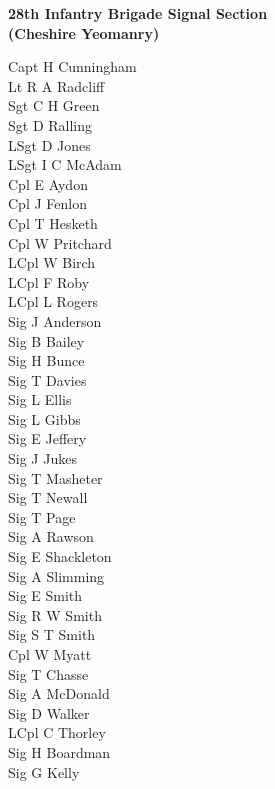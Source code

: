 \vspace*{10mm}

\begin{center}
  \Large
  \textbf{28th Infantry Brigade Signal Section \\ (Cheshire Yeomanry)}
\end{center}

\begin{multicols}{3}
  \footnotesize
  \noindent
  Capt H Cunningham \\
  Lt R A Radcliff \\
  Sgt C H Green \\
  Sgt D Ralling \\
  LSgt D Jones \\
  LSgt I C McAdam \\
  Cpl E Aydon \\
  Cpl J Fenlon \\
  Cpl T Hesketh \\
  Cpl W Pritchard \\
  LCpl W Birch \\
  LCpl F Roby \\
  LCpl L Rogers \\
  Sig J Anderson \\
  Sig B Bailey \\
  Sig H Bunce \\
  Sig T Davies \\
  Sig L Ellis \\
  Sig L Gibbs \\
  Sig E Jeffery \\
  Sig J Jukes \\
  Sig T Masheter \\
  Sig T Newall \\
  Sig T Page \\
  Sig A Rawson \\
  Sig E Shackleton \\
  Sig A Slimming \\
  Sig E Smith \\
  Sig R W Smith \\
  Sig S T Smith \\
  Cpl W Myatt \\
  Sig T Chasse \\
  Sig A McDonald \\
  Sig D Walker \\
  LCpl C Thorley \\
  Sig H Boardman \\
  Sig G Kelly \\

\end{multicols}
